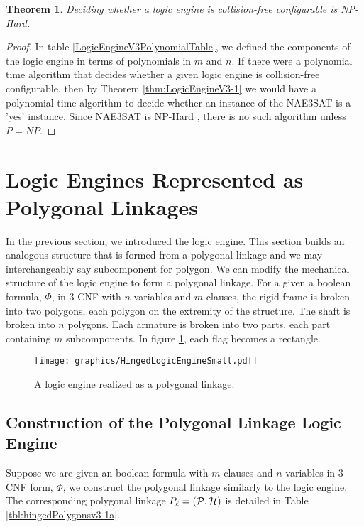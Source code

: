 \documentclass[10pt]{CSUNthesis}
\theoremstyle{plain}%
\newtheorem{thm}{Theorem}
\theoremstyle{definition}
\theoremstyle{remark}
\newcommand{\HH}{{\cal H}} %
\renewcommand{\PP}{{\cal P}} %
\begin{document}
\begin{thm}\label{thm:LogicEngineV3-2}
Deciding whether a logic engine is collision-free configurable is NP-Hard.
\end{thm}
\begin{proof}
In table \ref{LogicEngineV3PolynomialTable}, we defined the components of the logic engine in terms of polynomials in $m$ and $n$. 
If there were a polynomial time algorithm that decides whether a given logic engine is collision-free configurable, then by Theorem \ref{thm:LogicEngineV3-1} we would have a polynomial time algorithm to decide whether an instance of the NAE3SAT is a 'yes' instance.  
Since NAE3SAT is NP-Hard \cite{NAE3SATisNPhard}, there is no such algorithm unless $P = NP$.
\end{proof}\section{Logic Engines Represented as Polygonal Linkages}   
In the previous section, we introduced the logic engine.  
This section builds an analogous structure that is formed from a polygonal linkage and we may interchangeably say subcomponent for polygon.
We can modify the mechanical structure of the logic engine to form a polygonal linkage.  
For a given a boolean formula, $\Phi$, in 3-CNF with $n$ variables and $m$ clauses,
the rigid frame is broken into two polygons, each polygon on the extremity of the structure.
The shaft is broken into $n$ polygons.
Each armature is broken into two parts, each part containing $m$ subcomponents.
In figure \ref{fig:HingedLogicEngineSmall.pdf}, each flag becomes a rectangle.

\begin{figure}[!htbp]
\begin{center}
\texttt{[image: graphics/HingedLogicEngineSmall.pdf]}
\caption{A logic engine realized as a polygonal linkage.}\label{fig:HingedLogicEngineSmall.pdf}
\end{center}
\end{figure}
\subsection{Construction of the Polygonal Linkage Logic Engine}
Suppose we are given an boolean formula with $m$ clauses and $n$ variables in 3-CNF form, $\Phi$, we construct the polygonal linkage similarly to the logic engine.
The corresponding polygonal linkage $P_\ell = (\PP,\HH)$ is detailed in Table \ref{tbl:hingedPolygonsv3-1a}.
\end{document}
